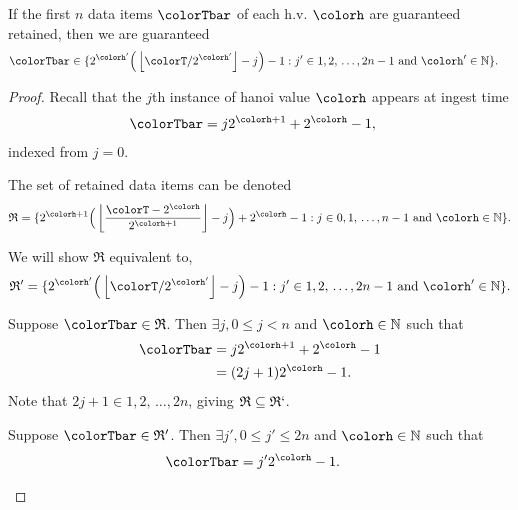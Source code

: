 \begin{lemma}
\label{thm:retained-equivalence-stretched}
If the first $n$ data items $\colorTbar$ of each h.v. $\colorh$ are guaranteed retained, then we are guaranteed
\begin{align*}
\colorTbar
&\in
\{
  2^{\colorh'}\Big(\left\lfloor \colorT / 2^{\colorh'} \right\rfloor - j\Big) - 1
  :
  j' \in 1,2,\,\ldots,2n-1
  \text{ and }
  \colorh' \in \mathbb{N}
\}.
\end{align*}
\end{lemma}
\begin{proof}

Recall that the $j$th instance of hanoi value $\colorh$ appears at ingest time
\begin{align*}
\colorTbar
&= j2^{\colorh + 1} + 2^{\colorh} - 1,
\end{align*}
indexed from $j=0$.

The set of retained data items can be denoted
\begin{align*}
\mathfrak{R} =
\{
  2^{\colorh + 1}\Big( \left\lfloor\frac{\colorT - 2^{\colorh}}{2^{\colorh + 1}} \right\rfloor - j\Big) + 2^{\colorh} - 1
  :
  j \in 0,1,\,\ldots,n-1
  \text{ and }
  \colorh \in \mathbb{N}
\}.
\end{align*}

We will show $\mathfrak{R}$ equivalent to,
\begin{align*}
\mathfrak{R}' =
\{
  2^{\colorh'}\Big(\left\lfloor \colorT / 2^{\colorh'} \right\rfloor - j\Big) - 1
  :
  j' \in 1,2,\,\ldots,2n-1
  \text{ and }
  \colorh' \in \mathbb{N}
\}.
\end{align*}

\begin{proofpart}
Suppose $\colorTbar \in \mathfrak{R}$.
Then $\exists j,  0 \leq j < n$ and $\colorh \in \mathbb{N}$ such that
\begin{align*}
\colorTbar
&= j2^{\colorh + 1} + 2^{\colorh} - 1\\
&= (2j + 1)2^{\colorh} - 1.
\end{align*}
Note that $2j + 1 \in 1,2,\,\ldots,2n$, giving $\mathfrak{R} \subseteq \mathfrak{R}`$.
\end{proofpart}

\begin{proofpart}
Suppose $\colorTbar \in \mathfrak{R}'$.
Then $\exists j',  0 \leq j' \leq 2n$ and $\colorh \in \mathbb{N}$ such that
\begin{align*}
\colorTbar
&= j'2^{\colorh} - 1.
\end{align*}


\end{proofpart}
\end{proof}
